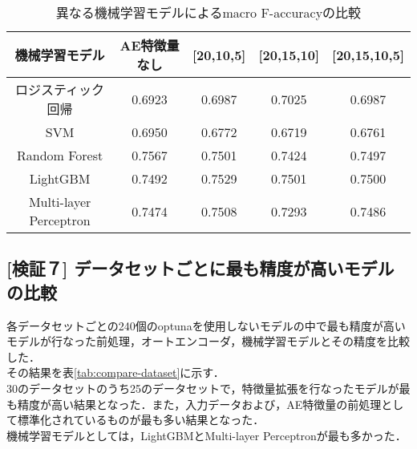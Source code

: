 \begin{table}[htbp]
    \caption{異なる機械学習モデルによるmacro F-accuracyの比較}
    \label{tab:compare-model}
    \centering
    \begin{tabular}{ccccc}
        \hline
        機械学習モデル& AE特徴量なし & [20,10,5] & [20,15,10]& [20,15,10,5] \\ 
        \hline
        ロジスティック回帰  & 0.6923& 0.6987&  0.7025& 0.6987\\
        SVM & 0.6950& 0.6772& 0.6719& 0.6761\\
        Random Forest & 0.7567& 0.7501& 0.7424&  0.7497\\
        LightGBM & 0.7492& 0.7529& 0.7501& 0.7500\\
        Multi-layer Perceptron & 0.7474& 0.7508&  0.7293& 0.7486\\
        \hline
    \end{tabular}
\end{table}

\subsection{[検証７] データセットごとに最も精度が高いモデルの比較}
各データセットごとの240個のoptunaを使用しないモデルの中で最も精度が高いモデルが行なった前処理，オートエンコーダ，機械学習モデルとその精度を比較した．\\
その結果を表\ref{tab:compare-dataset}に示す．\\
30のデータセットのうち25のデータセットで，特徴量拡張を行なったモデルが最も精度が高い結果となった．また，入力データおよび，AE特徴量の前処理として標準化されているものが最も多い結果となった．\\
機械学習モデルとしては，LightGBMとMulti-layer Perceptronが最も多かった．\\

